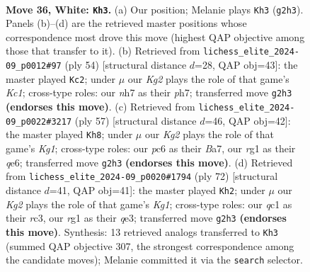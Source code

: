 \documentclass[11pt]{article}
\begin{document}
\clearpage

\begin{figure}[p]\centering
\begin{subfigure}{0.46\textwidth}\centering
\resizebox{\linewidth}{!}{%
\newchessgame
\chessboard[
  setfen={7k/p2p3n/2p2p2/8/1P1P2Q1/6R1/5PKP/2q3r1 w - - 4 36},
  showmover=false,
  pgfstyle=straightmove, color=movearrow, markmove={g2-h3}
]}
\caption{}
\end{subfigure}\hfill
\begin{subfigure}{0.46\textwidth}\centering
\resizebox{\linewidth}{!}{%
\newchessgame
\chessboard[
  setfen={q5k1/7p/3Qp1p1/8/6P1/1P3P2/1P5P/r1KR4 w - - 1 28},
  showmover=false,
  pgfstyle=straightmove, color=movearrow, markmove={c1-c2}
]}
\caption{}
\end{subfigure}
\\[4pt]
\begin{subfigure}{0.46\textwidth}\centering
\resizebox{\linewidth}{!}{%
\newchessgame
\chessboard[
  setfen={5rk1/b5pp/4Q3/p3N3/8/8/1P3qPP/3R3K b - - 0 29},
  showmover=false,
  pgfstyle=straightmove, color=movearrow, markmove={g8-h8}
]}
\caption{}
\end{subfigure}\hfill
\begin{subfigure}{0.46\textwidth}\centering
\resizebox{\linewidth}{!}{%
\newchessgame
\chessboard[
  setfen={8/p4pk1/7p/p2pPQ2/3P4/2r1q3/P5P1/5RK1 w - - 2 37},
  showmover=false,
  pgfstyle=straightmove, color=movearrow, markmove={g1-h2}
]}
\caption{}
\end{subfigure}
\caption{\textbf{Move 36, White: \texttt{Kh3}.} (a) Our position; Melanie plays \texttt{Kh3} (\texttt{g2h3}). Panels (b)--(d) are the retrieved master positions whose correspondence most drove this move (highest QAP objective among those that transfer to it). (b) Retrieved from \texttt{lichess\_elite\_2024-09\_p0012\#97} (ply 54) [structural distance $d$=28, QAP obj=43]: the master played \texttt{Kc2}; under $\mu$ our \emph{Kg2} plays the role of that game's \emph{Kc1}; cross-type roles: our \emph{n}h7 as their \emph{p}h7; transferred move \texttt{g2h3} \textbf{(endorses this move)}. (c) Retrieved from \texttt{lichess\_elite\_2024-09\_p0022\#3217} (ply 57) [structural distance $d$=46, QAP obj=42]: the master played \texttt{Kh8}; under $\mu$ our \emph{Kg2} plays the role of that game's \emph{Kg1}; cross-type roles: our \emph{p}c6 as their \emph{B}a7, our \emph{r}g1 as their \emph{q}e6; transferred move \texttt{g2h3} \textbf{(endorses this move)}. (d) Retrieved from \texttt{lichess\_elite\_2024-09\_p0020\#1794} (ply 72) [structural distance $d$=41, QAP obj=41]: the master played \texttt{Kh2}; under $\mu$ our \emph{Kg2} plays the role of that game's \emph{Kg1}; cross-type roles: our \emph{q}c1 as their \emph{r}c3, our \emph{r}g1 as their \emph{q}e3; transferred move \texttt{g2h3} \textbf{(endorses this move)}. Synthesis: 13 retrieved analogs transferred to \texttt{Kh3} (summed QAP objective 307, the strongest correspondence among the candidate moves); Melanie committed it via the \texttt{search} selector.}
\label{fig:thought-m70}
\end{figure}
\end{document}
